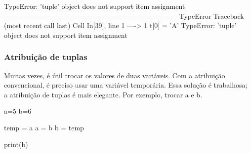 \documentclass[
  brazilian,
  letterpaper,
  DIV=11,
  numbers=noendperiod]{scrreprt}
\newenvironment{Shaded}{\begin{snugshade}}{\end{snugshade}}
\newcommand{\BuiltInTok}[1]{\textcolor[rgb]{0.00,0.23,0.31}{#1}}
\newcommand{\DecValTok}[1]{\textcolor[rgb]{0.68,0.00,0.00}{#1}}
\newcommand{\NormalTok}[1]{\textcolor[rgb]{0.00,0.23,0.31}{#1}}
\newcommand{\OperatorTok}[1]{\textcolor[rgb]{0.37,0.37,0.37}{#1}}
\begin{document}
\begin{Highlighting}
\textcolor{black}{TypeError: 'tuple' object does not support item assignment}
\textcolor{black}{}\textcolor{QuartoInternalColor4}{---------------------------------------------------------------------------}\textcolor{QuartoInternalColor2}{}
\textcolor{QuartoInternalColor2}{}\textcolor{QuartoInternalColor4}{TypeError}\textcolor{QuartoInternalColor2}{                                 Traceback (most recent call last)}
\textcolor{QuartoInternalColor2}{}\textcolor{QuartoInternalColor1}{Cell}\textcolor{QuartoInternalColor2}{}\textcolor{QuartoInternalColor1}{ }\textcolor{QuartoInternalColor2}{}\textcolor{QuartoInternalColor3}{In[39]}\textcolor{QuartoInternalColor2}{}\textcolor{QuartoInternalColor3}{, line 1}\textcolor{QuartoInternalColor2}{}
\textcolor{QuartoInternalColor2}{}\textcolor{QuartoInternalColor3}{----> }\textcolor{QuartoInternalColor2}{}\textcolor{QuartoInternalColor3}{1}\textcolor{QuartoInternalColor2}{ }\textcolor{QuartoInternalColor2}{t}\textcolor{QuartoInternalColor2}{}\textcolor{QuartoInternalColor2}{[}\textcolor{QuartoInternalColor2}{}\textcolor{QuartoInternalColor2}{0}\textcolor{QuartoInternalColor2}{}\textcolor{QuartoInternalColor2}{]}\textcolor{QuartoInternalColor2}{ = }\textcolor{QuartoInternalColor6}{'}\textcolor{QuartoInternalColor2}{}\textcolor{QuartoInternalColor6}{A}\textcolor{QuartoInternalColor2}{}\textcolor{QuartoInternalColor6}{'}\textcolor{QuartoInternalColor2}{}
\textcolor{QuartoInternalColor2}{}\textcolor{QuartoInternalColor4}{TypeError}\textcolor{QuartoInternalColor2}{: 'tuple' object does not support item assignment}
\end{Highlighting}

\subsubsection{Atribuição de tuplas}\label{atribuiuxe7uxe3o-de-tuplas}

Muitas vezes, é útil trocar os valores de duas variáveis. Com a
atribuição convencional, é preciso usar uma variável temporária. Essa
solução é trabalhosa; a atribuição de tuplas é mais elegante. Por
exemplo, trocar a e b.

\begin{Shaded}
\begin{Highlighting}[]
\NormalTok{a}\OperatorTok{=}\DecValTok{5}
\NormalTok{b}\OperatorTok{=}\DecValTok{6}

\NormalTok{temp }\OperatorTok{=}\NormalTok{ a}
\NormalTok{a }\OperatorTok{=}\NormalTok{ b}
\NormalTok{b }\OperatorTok{=}\NormalTok{ temp}

\BuiltInTok{print}\NormalTok{(b)}
\end{Highlighting}
\end{Shaded}
\end{document}
